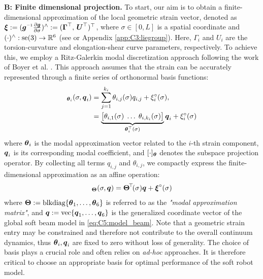 \textbf{B: Finite dimensional projection.} To start, our aim is to obtain a finite-dimensional approximation of the local geometric strain vector, denoted as $\xiB:= (\gB\inv \tfrac{\p \gB}{\p \sigma})^\wedge := (\GammaB^\top,\,\UB^\top)^\top$, where $\sigma \in [0,L]$ is a spatial coordinate and $(\cdot)^{\wedge}: \textrm{se}(3) \to \mathbb{R}^6$ (see \cite{Murray1994} or Appendix \ref{app:C3:liegroup}). Here, $\Gamma_{i}$ and $U_{i}$ are the torsion-curvature and elongation-shear curve parameters, respectively. To achieve this, we employ a Ritz-Galerkin modal discretization approach following the work of Boyer et al. \cite{Boyer2021}. This approach assumes that the strain can be accurately represented through a finite series of orthonormal basis functions:
%
\begin{align}
[\xi_i]_{\thetaB_i}(\sigma,\q_i) & = \sum_{j=1}^{k_i} \theta_{i,j}(\sigma) q_{i,j} + \xi_i^\circ (\sigma), \notag \\ & = \underbrace{\big[\theta_{i,1}(\sigma)\; \hdots\; \theta_{i,k_i} (\sigma) \big]}_{\thetaB_i^\top(\sigma)} \q_i + \xi_i^\circ(\sigma)
\end{align}
%
where ${\boldsymbol{\theta}}_i$ is the modal approximation vector related to the $i$-th strain component, ${\boldsymbol{q}}_i$ is its corresponding modal coefficient, and $[\cdot]_{{\boldsymbol{\theta}}}$ denotes the subspace projection operator. By collecting all terms $q_{i,j}$ and $\theta_{i,j}$, we compactly express the finite-dimensional approximation as an affine operation:
%
\begin{equation}
[\xiB]_{\ThetaB}(\sigma,\q) = \ThetaB^{\!\top}\!(\sigma) \q + \xiB^{\circ}(\sigma)
\label{eq:C5:xi_computation_POD}
\end{equation}
%
where ${\boldsymbol{\Theta}}:= \textrm{blkdiag}\{{\boldsymbol{\theta}}_1,\dots,{\boldsymbol{\theta}}_6\}$ is referred to as the \textit{"modal approximation matrix"}, and ${\boldsymbol{q}}:=\textrm{vec}\{{\boldsymbol{q}}_1,\dots,{\boldsymbol{q}}_6\}$ is the generalized coordinate vector of the global soft beam model in \eqref{eq:C5:model_beam}. Note that a geometric strain entry may be constrained and therefore not contribute to the overall continuum dynamics, thus ${\boldsymbol{\theta}}_i,{\boldsymbol{q}}_i$ are fixed to zero without loss of generality. The choice of basis plays a crucial role and often relies on \textit{ad-hoc} approaches. It is therefore critical to choose an appropriate basis for optimal performance of the soft robot model.
% 

